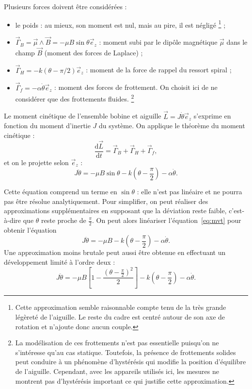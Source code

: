 \documentclass[12pt,a4paper,fleqn]{article}
\newcommand{\ez}{\vec{e}_z}
\renewcommand{\d}{\mathrm{d}}
\newcommand{\cad}{c'est-à-dire}
\begin{document}
Plusieurs forces doivent être considérées :
\begin{itemize}
    \item le poids : au mieux, son moment est nul, mais au pire, il est négligé \footnote{Cette approximation semble raisonnable compte tenu de la très grande légèreté de l'aiguille.
    Le reste du cadre est centré autour de son axe de rotation et n'ajoute donc aucun couple.} ;
    \item $\vec{\Gamma}_B = \vec{\mu} \wedge \vec{B} = - \mu B \sin \theta \ez$ : moment subi par le dipôle magnétique $\vec{\mu}$ dans le champ $\vec{B}$ (moment des forces de Laplace) ;
    \item $\vec{\Gamma}_H = -k(\theta-\pi/2)\ez$ : moment de la force de rappel du ressort spiral ;
    \item $\vec{\Gamma}_f = -\alpha\dot{\theta}\ez$ : moment des forces de frottement.
    On choisit ici de ne considérer que des frottements fluides.
    \footnote{
        La modélisation de ces frottements n'est pas essentielle puisqu'on ne s'intéresse qu'au cas statique.
        Toutefois, la présence de frottements solides peut conduire à un phénomène d'hystérésis qui modifie la position d'équilibre de l'aiguille.
        Cependant, avec les appareils utilisés ici, les mesures ne montrent pas d'hystérésis important ce qui justifie cette approximation.}
\end{itemize}

Le moment cinétique de l'ensemble bobine et aiguille $\vec{L} = J\dot{\theta}\ez$ s'exprime en fonction du moment d'inertie $J$ du système.
On applique le théorème du moment cinétique :
\begin{equation}
    \frac{\d\vec{L}}{\d t} 	= \vec{\Gamma}_B + \vec{\Gamma}_H + \vec{\Gamma}_f,
\end{equation}
et on le projette selon $\ez$ :
\begin{equation}
    J\ddot{\theta} = -\mu B \sin \theta - k\left(\theta-\frac{\pi}{2}\right) - \alpha\dot{\theta}.
    \label{eq:mvt}
\end{equation}

Cette équation comprend un terme en $\sin\theta$ : elle n'est pas linéaire et ne pourra pas être résolue analytiquement.
Pour simplifier, on peut réaliser des approximations supplémentaires en supposant que la déviation reste faible, \cad{} que $\theta$ reste \og proche \fg{} de $\tfrac{\pi}{2}$.
On peut alors linéariser l'équation~\ref{eq:mvt} pour obtenir l'équation
\begin{equation}
    J\ddot{\theta} = -\mu B - k\left(\theta-\frac{\pi}{2}\right) - \alpha\dot{\theta}.
    \label{eq:mvt_lin}
\end{equation}
Une approximation moins brutale peut aussi être obtenue en effectuant un développement limité à l'ordre deux :
\begin{equation}
    J\ddot{\theta} = - \mu B \left[ 1-\frac{\left(\theta-\frac{\pi}{2}\right)^2}{2} \right] - k\left(\theta-\frac{\pi}{2}\right) - \alpha\dot{\theta}.
    \label{eq:mvt_dl}
\end{equation}
\end{document}
